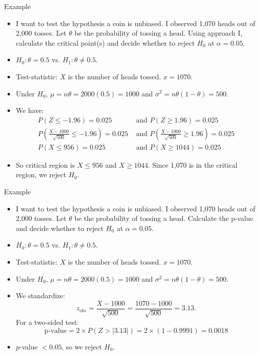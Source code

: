 \documentclass[10pt, handout, xcolor=table]{beamer}
\begin{document}
\begin{frame}{Example}
\begin{itemize}
\setlength{\itemsep}{5pt}
\item I want to test the hypothesis a coin is unbiased. I observed 1,070 heads out of 2,000 tosses. Let $\theta$ be the probability of tossing a head. Using approach I, calculate the critical point(s) and decide whether to reject $H_0$ at $\alpha = 0.05$.
\item<2->[Ans:] \color{red} $H_0: \theta = 0.5$ vs. $H_1: \theta \neq 0.5$.
\item<2->[] \color{red} Test-statistic: $X$ is the number of heads tossed. $x = 1070$.
\item<2->[] \color{red} Under $H_0$, $\mu = n\theta = 2000(0.5) = 1000$ and $\sigma^2 = n\theta(1-\theta) = 500$.
\item<2->[] \color{red} We have:
\vspace*{-1ex}
\small
\begin{align*}
P(Z \leq -1.96) = 0.025  &\text{ and } P(Z\geq 1.96) = 0.025\\
P\left(\frac{X - 1000}{\sqrt{500}} \leq -1.96\right) =0.025 &\text{ and } P\left(\frac{X - 1000}{\sqrt{500}} \geq1.96\right)=0.025 \\
P(X \leq 956)=0.025 &\text{ and } P(X \geq 1044) = 0.025
\end{align*}
\item<2->[] \color{red} So critical region is $X \leq 956$ and $X \geq 1044$. Since 1,070 is in the critical region, we reject $H_0$.
\end{itemize}
\end{frame}

\begin{frame}{Example}
\begin{itemize}
\setlength{\itemsep}{5pt}
\item I want to test the hypothesis a coin is unbiased. I observed 1,070 heads out of 2,000 tosses. Let $\theta$ be the probability of tossing a head. Calculate the p-value and decide whether to reject $H_0$ at $\alpha = 0.05$.
\item<2->[Ans:] \color{red} $H_0: \theta = 0.5$ vs. $H_1: \theta \neq 0.5$.
\item<2->[] \color{red} Test-statistic: $X$ is the number of heads tossed. $x = 1070$.
\item<2->[] \color{red} Under $H_0$, $\mu = n\theta = 2000(0.5) = 1000$ and $\sigma^2 = n\theta(1-\theta) = 500$.
\item<2->[] \color{red} We standardize:
\vspace*{-1ex}
\small
$$z_{obs} = \frac{X - 1000}{\sqrt{500}} = \frac{1070 - 1000}{\sqrt{500}} = 3.13.$$
For a two-sided test:
$$\text{p-value} = 2\times P(Z > |3.13|) = 2 \times (1 - 0.9991) = 0.0018$$
\item<2->[] \color{red} $p$-value $< 0.05$, so we reject $H_0$.
\end{itemize}
\end{frame}
\end{document}
